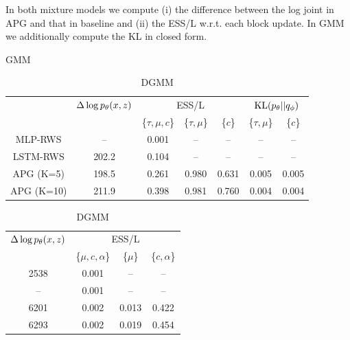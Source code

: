 \documentclass[anonymous=false, %
               format=acmsmall, %
               review=true, %
               screen=true, %
               nonacm=true]{acmart}
\theoremstyle{definition}
\begin{document}
\setlength{\tabcolsep}{2pt}
\begin{table}[t!]
    \centering
    \caption{In both mixture models we compute (i) the difference between the log joint in APG and that in baseline and (ii) the ESS/L w.r.t. each block update. In GMM we additionally compute the KL in closed form.}
    \vspace*{-3.5mm}
    \begin{subtable}{.4\linewidth}
    \centering
    \caption{GMM}
    \vspace{-0.7em}
    \begin{tabular}{ccc|cccc}
     
    \toprule
        & $\Delta \log p_\theta(x, z)$ & 
        \multicolumn{3}{c}{ESS/L} &
        \multicolumn{2}{c}{$\mathrm{KL}(p_\theta || q_\phi)$}\\
      & & \{$\tau, \mu, c$\} & \{$\tau, \mu$\} & \{$c$\} &\{$\tau, \mu$\}  & \{$c$\} \\
    \midrule
     MLP-RWS & -- & 0.001 & --& -- & -- & --\\
     LSTM-RWS & 202.2 & 0.104 & -- & -- & --
     & -- \\
     APG (K=5) & 198.5 & 0.261 & 0.980 &  0.631 & 0.005 & 0.005
\\
     APG (K=10) & 211.9 & 0.398 & 0.981  & 0.760
     & 0.004 & 0.004
     \\
    \bottomrule
    \end{tabular}   
    \label{table-gmm}
    \end{subtable}%
    \begin{subtable}{.85\linewidth}
    \centering
    \caption{DGMM}
    \vspace{-0.7em}
    \begin{tabular}{cc|cc}
    \toprule
     $\Delta \log p_\theta(x, z)$ & 
         \multicolumn{3}{c}{ESS/L} \\
         & \{$\mu, c, \alpha $\}& \{$\mu$\} & \{$c, \alpha$\}\\
    \midrule
    2538 & 0.001 & -- & -- \\
    -- & 0.001 & -- & --\\
    6201 & 0.002 & 0.013 & 0.422 \\
    6293 & 0.002 & 0.019 & 0.454 \\
    \bottomrule
    \end{tabular}
    \label{table-dgmm}
    \end{subtable}
    \label{table-both-mm}
\end{table}
\end{document}
